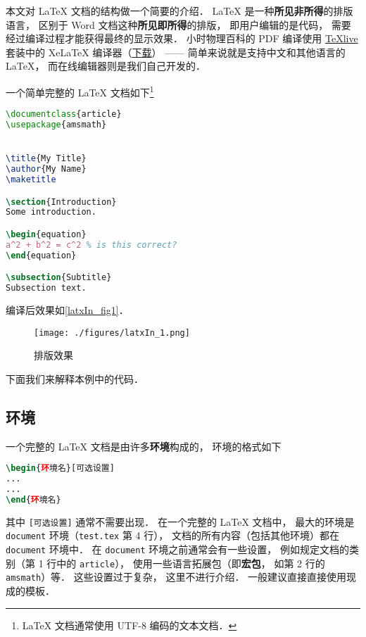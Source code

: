 
本文对 LaTeX 文档的结构做一个简要的介绍． LaTeX 是一种\textbf{所见非所得}的排版语言， 区别于 Word 文档这种\textbf{所见即所得}的排版， 即用户编辑的是代码， 需要经过编译过程才能获得最终的显示效果． 小时物理百科的 PDF 编译使用 \href{https://www.tug.org/texlive/}{TeXlive} 套装中的 XeLaTeX 编译器（\href{https://www.tug.org/texlive/acquire-iso.html}{下载}）%
—— 简单来说就是支持中文和其他语言的 LaTeX， 而在线编辑器则是我们自己开发的．

一个简单完整的 LaTeX 文档如下\footnote{LaTeX 文档通常使用 UTF-8 编码的文本文档．}

\begin{lstlisting}[language=latex, caption=test.tex]
\documentclass{article}
\usepackage{amsmath}


\title{My Title}
\author{My Name}
\maketitle

\section{Introduction}
Some introduction.

\begin{equation}
a^2 + b^2 = c^2 % is this correct?
\end{equation}

\subsection{Subtitle}
Subsection text.


\end{lstlisting}

编译后效果如\autoref{latxIn_fig1}．
\begin{figure}[ht]
\centering
\texttt{[image: ./figures/latxIn\_1.png]}
\caption{排版效果} \label{latxIn_fig1}
\end{figure}
下面我们来解释本例中的代码．

\subsection{环境}
一个完整的 LaTeX 文档是由许多\textbf{环境}构成的， 环境的格式如下
\begin{lstlisting}[language=latex]
\begin{环境名}[可选设置]
...
...
\end{环境名}
\end{lstlisting}
其中 \verb|[可选设置]| 通常不需要出现． 在一个完整的 LaTeX 文档中， 最大的环境是 \verb|document| 环境（\verb|test.tex| 第 4 行）， 文档的所有内容（包括其他环境）都在 \verb|document| 环境中． 在 \verb|document| 环境之前通常会有一些设置， 例如规定文档的类别（第 1 行中的 \verb|article|）， 使用一些语言拓展包（即\textbf{宏包}， 如第 2 行的 \verb|amsmath|）等． 这些设置过于复杂， 这里不进行介绍． 一般建议直接直接使用现成的模板．

